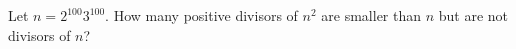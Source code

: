 Let $n=2^{100}3^{100}$. How many positive divisors of $n^2$ are smaller than $n$ but are not divisors of $n$?
